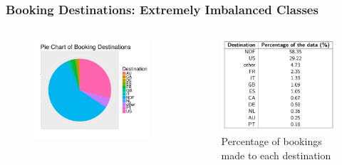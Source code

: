 \documentclass{beamer}
\begin{document}
\begin{frame}
\frametitle{Booking Destinations: Extremely Imbalanced Classes}
\begin{columns}
  \begin{column}{0.45\textwidth}
      \begin{figure}
        \includegraphics[width = 1.0\textwidth]{pie_chart_dest.pdf} 
      \end{figure}
  \end{column}
  \begin{column}{0.55\textwidth}
      \begin{figure}
        \includegraphics[width = 1.0\textwidth]{dest_table.png} 
        \caption{Percentage of bookings made to each destination}
      \end{figure}
  \end{column}
  \end{columns}
\end{frame}
\end{document}
